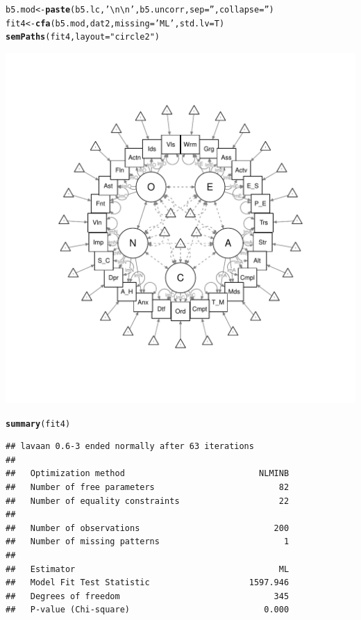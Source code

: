 \documentclass{article}\usepackage[]{graphicx}\usepackage[]{color}
\makeatletter
\def\maxwidth{ %
  \ifdim\Gin@nat@width>\linewidth
    \linewidth
  \else
    \Gin@nat@width
  \fi
}
\newcommand{\hlstr}[1]{\textcolor[rgb]{0.192,0.494,0.8}{#1}}%
\newcommand{\hlstd}[1]{\textcolor[rgb]{0.345,0.345,0.345}{#1}}%
\newcommand{\hlkwb}[1]{\textcolor[rgb]{0.69,0.353,0.396}{#1}}%
\newcommand{\hlkwc}[1]{\textcolor[rgb]{0.333,0.667,0.333}{#1}}%
\newcommand{\hlkwd}[1]{\textcolor[rgb]{0.737,0.353,0.396}{\textbf{#1}}}%
\newenvironment{kframe}{%
 \def\at@end@of@kframe{}%
 \ifinner\ifhmode%
  \def\at@end@of@kframe{\end{minipage}}%
  \begin{minipage}{\columnwidth}%
 \fi\fi%
 \def\FrameCommand##1{\hskip\@totalleftmargin \hskip-\fboxsep
 \colorbox{shadecolor}{##1}\hskip-\fboxsep
     \hskip-\linewidth \hskip-\@totalleftmargin \hskip\columnwidth}%
 \MakeFramed {\advance\hsize-\width
   \@totalleftmargin\z@ \linewidth\hsize
   \@setminipage}}%
 {\par\unskip\endMakeFramed%
 \at@end@of@kframe}
\newenvironment{knitrout}{}{} %
\makeatother
\begin{document}
\begin{knitrout}
\begin{kframe}
\begin{alltt}
\hlstd{b5.mod} \hlkwb{<-} \hlkwd{paste}\hlstd{(b5.lc,} \hlstr{'\textbackslash{}n\textbackslash{}n'}\hlstd{, b5.uncorr,} \hlkwc{sep} \hlstd{=} \hlstr{''}\hlstd{,} \hlkwc{collapse} \hlstd{=} \hlstr{''}\hlstd{)}
\hlstd{fit4} \hlkwb{<-} \hlkwd{cfa}\hlstd{(b5.mod, dat2,} \hlkwc{missing} \hlstd{=} \hlstr{'ML'}\hlstd{,} \hlkwc{std.lv} \hlstd{= T)}
\hlkwd{semPaths}\hlstd{(fit4,} \hlkwc{layout} \hlstd{=} \hlstr{"circle2"}\hlstd{)}
\end{alltt}
\end{kframe}
\includegraphics[width=\maxwidth]{figure/unnamed-chunk-12-1} 
\begin{kframe}\begin{alltt}
\hlkwd{summary}\hlstd{(fit4)}
\end{alltt}
\begin{verbatim}
## lavaan 0.6-3 ended normally after 63 iterations
## 
##   Optimization method                           NLMINB
##   Number of free parameters                         82
##   Number of equality constraints                    22
## 
##   Number of observations                           200
##   Number of missing patterns                         1
## 
##   Estimator                                         ML
##   Model Fit Test Statistic                    1597.946
##   Degrees of freedom                               345
##   P-value (Chi-square)                           0.000

\end{verbatim}
\end{kframe}
\end{knitrout}
\end{document}
